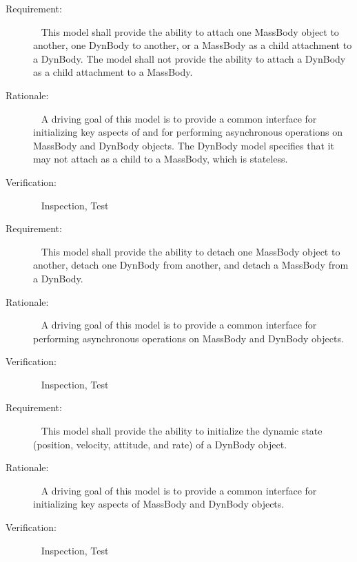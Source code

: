 \label{reqt:overview:mass_attach}
\begin{description}
\item[Requirement:]\ \newline
  This model shall provide the ability to attach one MassBody object
  to another, one DynBody to another, or a MassBody as a child attachment to a
  DynBody. The model shall not provide the ability to attach a DynBody as a
  child attachment to a MassBody.

\item[Rationale:]\ \newline
  A driving goal of this model is to provide a common interface
  for initializing key aspects of
  and for performing asynchronous operations on
  MassBody and DynBody objects. The DynBody model specifies that it may not
  attach as a child to a MassBody, which is stateless.

\item[Verification:]\ \newline
  Inspection, Test
\end{description}

\label{reqt:overview:mass_detach}
\begin{description}
\item[Requirement:]\ \newline
  This model shall provide the ability to detach one MassBody object
  to another, detach one DynBody from another, and detach a MassBody from a
  DynBody.

\item[Rationale:]\ \newline
  A driving goal of this model is to provide a common interface
  for performing asynchronous operations on
  MassBody and DynBody objects.

\item[Verification:]\ \newline
  Inspection, Test
\end{description}

\label{reqt:overview:dyn_body_init}
\begin{description}
\item[Requirement:]\ \newline
  This model shall provide the ability to
  initialize the dynamic state (position, velocity,
  attitude, and rate) of a DynBody object.

\item[Rationale:]\ \newline
  A driving goal of this model is to provide a common interface
  for initializing key aspects of MassBody and DynBody objects.

\item[Verification:]\ \newline
  Inspection, Test
\end{description}

